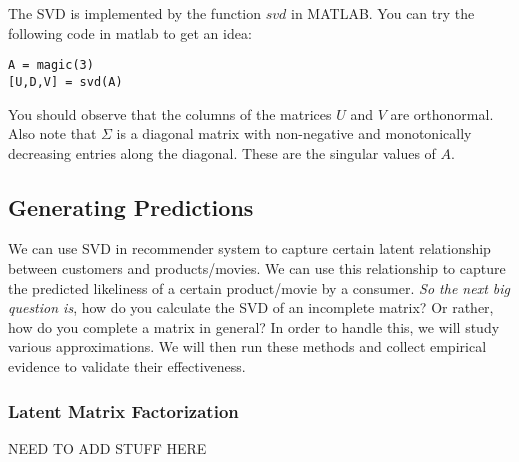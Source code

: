 The SVD is implemented by the function $svd$ in MATLAB. You can try the following code in matlab to get an idea:
\begin{verbatim}
A = magic(3)
[U,D,V] = svd(A)
\end{verbatim}

You should observe that the columns of the matrices $U$ and $V$ are orthonormal. Also note that $\Sigma$ is a diagonal matrix with non-negative and monotonically decreasing entries along the diagonal. These are the singular values of $A$.
  \subsection{Generating Predictions}
  We can use SVD in recommender system to capture certain latent relationship between customers and products/movies. We can use this relationship to capture the predicted likeliness of a certain product/movie by a consumer. \textit{So the next big question is}, how do you calculate the SVD of an incomplete matrix? Or rather, how do you complete a matrix in general? In order to handle this, we will study various approximations. We will then run these methods and collect empirical evidence to validate their effectiveness.
  \subsubsection{Latent Matrix Factorization}
  NEED TO ADD STUFF HERE

